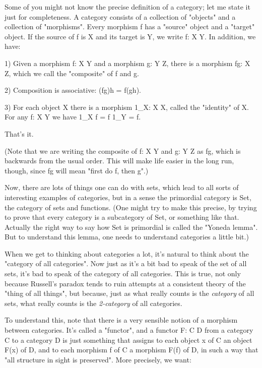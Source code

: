 Some of you might not know the precise definition of a category; let me
state it just for completeness.  A category consists of a collection of
"objects" and a collection of "morphisms".  Every morphism f has a
"source" object and a "target" object.  If the source of f is X and its
target is Y, we write f: X \to  Y.  In addition, we have:

1)  Given a morphism f: X \to  Y and a morphism g: Y \to  Z, there
is a morphism fg: X \to  Z, which we call the "composite" of
f and g. 

2)  Composition is associative:  (fg)h = f(gh).

3)  For each object X there is a morphism 1_{X}: X \to  X, called the
"identity" of X.  For any f: X \to  Y we have 1_{X} f = f 1_{Y} =
f.

That's it. 

(Note that we are writing the composite of f: X \to  Y and g: Y \to  Z as
fg, which is backwards from the usual order.  This will make life easier
in the long run, though, since fg will mean "first do f, then g".)

Now, there are lots of things one can do with sets, which lead to all
sorts of interesting examples of categories, but in a sense the
primordial category is Set, the category of sets and functions.  (One
might try to make this precise, by trying to prove that every category
is a subcategory of Set, or something like that.  Actually the right way
to say how Set is primordial is called the "Yoneda lemma".  But to
understand this lemma, one needs to understand categories a little bit.)

When we get to thinking about categories a lot, it's natural to
think about the "category of all categories".  Now just as
it's a bit bad to speak of the set of all sets, it's bad to speak of the
category of all categories.  This is true, not only because Russell's
paradox tends to ruin attempts at a consistent theory of the "thing
of all things", but because, just as what really counts is the
\emph{category} of all sets, what really counts is the \emph{2-category} 
of all categories.

To understand this, note that there is a very sensible notion of a
morphism between categories.  It's called a "functor", and a functor
F: C \to  D from a category C to a category D is just something that
assigns to each object x of C an object F(x) of D, and to each morphism
f of C a morphism F(f) of D, in such a way that "all structure in sight
is preserved".   More precisely, we want:

